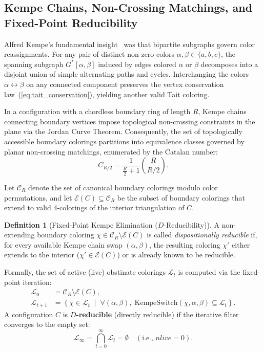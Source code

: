 \documentclass[11pt,a4paper]{article}
\theoremstyle{plain}
\theoremstyle{definition}
\newtheorem{definition}[theorem]{Definition}
\begin{document}
\subsection{Kempe Chains, Non-Crossing Matchings, and Fixed-Point Reducibility}

Alfred Kempe's fundamental insight~\cite{kempe1879geographical} was that bipartite subgraphs govern color reassignments. For any pair of distinct non-zero colors $\alpha, \beta \in \{a, b, c\}$, the spanning subgraph $G^*[\alpha, \beta]$ induced by edges colored $\alpha$ or $\beta$ decomposes into a disjoint union of simple alternating paths and cycles. Interchanging the colors $\alpha \leftrightarrow \beta$ on any connected component preserves the vertex conservation law~(\ref{eq:tait_conservation}), yielding another valid Tait coloring.

In a configuration with a chordless boundary ring of length $R$, Kempe chains connecting boundary vertices impose topological non-crossing constraints in the plane via the Jordan Curve Theorem. Consequently, the set of topologically accessible boundary colorings partitions into equivalence classes governed by planar non-crossing matchings, enumerated by the Catalan number:
\begin{equation}
C_{R/2} = \frac{1}{\frac{R}{2} + 1} \binom{R}{R/2}.
\end{equation}

Let $\mathcal{C}_R$ denote the set of canonical boundary colorings modulo color permutations, and let $\mathcal{E}(C) \subseteq \mathcal{C}_R$ be the subset of boundary colorings that extend to valid 4-colorings of the interior triangulation of $C$.

\begin{definition}[Fixed-Point Kempe Elimination ($D$-Reducibility)]
A non-extending boundary coloring $\chi \in \mathcal{C}_R \setminus \mathcal{E}(C)$ is called \emph{dispositionally reducible} if, for every available Kempe chain swap $(\alpha, \beta)$, the resulting coloring $\chi'$ either extends to the interior ($\chi' \in \mathcal{E}(C)$) or is already known to be reducible. 

Formally, the set of active (live) obstinate colorings $\mathcal{L}_t$ is computed via the fixed-point iteration:
\begin{align}
\mathcal{L}_0 &= \mathcal{C}_R \setminus \mathcal{E}(C), \\
\mathcal{L}_{t+1} &= \left\{ \chi \in \mathcal{L}_t \;\middle|\; \forall (\alpha, \beta), \; \text{KempeSwitch}(\chi, \alpha, \beta) \subseteq \mathcal{L}_t \right\}.
\end{align}
A configuration $C$ is \textbf{$D$-reducible} (directly reducible) if the iterative filter converges to the empty set:
\begin{equation}
\mathcal{L}_\infty = \bigcap_{t=0}^\infty \mathcal{L}_t = \emptyset \quad (\text{i.e., } nlive = 0).
\end{equation}
\end{definition}
\end{document}
